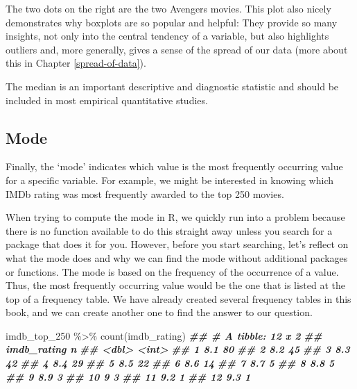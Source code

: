 \documentclass[
]{book}
\newenvironment{Shaded}{\begin{snugshade}}{\end{snugshade}}
\newcommand{\DocumentationTok}[1]{\textcolor[rgb]{0.56,0.35,0.01}{\textbf{\textit{#1}}}}
\newcommand{\FunctionTok}[1]{\textcolor[rgb]{0.00,0.00,0.00}{#1}}
\newcommand{\NormalTok}[1]{#1}
\newcommand{\SpecialCharTok}[1]{\textcolor[rgb]{0.00,0.00,0.00}{#1}}
\begin{document}
The two dots on the right are the two Avengers movies. This plot also nicely demonstrates why boxplots are so popular and helpful: They provide so many insights, not only into the central tendency of a variable, but also highlights outliers and, more generally, gives a sense of the spread of our data (more about this in Chapter \ref{spread-of-data}).

The median is an important descriptive and diagnostic statistic and should be included in most empirical quantitative studies.

\hypertarget{mode}{%
\subsection{Mode}\label{mode}}

Finally, the `mode' indicates which value is the most frequently occurring value for a specific variable. For example, we might be interested in knowing which IMDb rating was most frequently awarded to the top 250 movies.

When trying to compute the mode in R, we quickly run into a problem because there is no function available to do this straight away unless you search for a package that does it for you. However, before you start searching, let's reflect on what the mode does and why we can find the mode without additional packages or functions. The mode is based on the frequency of the occurrence of a value. Thus, the most frequently occurring value would be the one that is listed at the top of a frequency table. We have already created several frequency tables in this book, and we can create another one to find the answer to our question.

\begin{Shaded}
\begin{Highlighting}[]
\NormalTok{imdb\_top\_250 }\SpecialCharTok{\%\textgreater{}\%} \FunctionTok{count}\NormalTok{(imdb\_rating)}
\DocumentationTok{\#\# \# A tibble: 12 x 2}
\DocumentationTok{\#\#    imdb\_rating     n}
\DocumentationTok{\#\#          \textless{}dbl\textgreater{} \textless{}int\textgreater{}}
\DocumentationTok{\#\#  1         8.1    80}
\DocumentationTok{\#\#  2         8.2    45}
\DocumentationTok{\#\#  3         8.3    42}
\DocumentationTok{\#\#  4         8.4    29}
\DocumentationTok{\#\#  5         8.5    22}
\DocumentationTok{\#\#  6         8.6    14}
\DocumentationTok{\#\#  7         8.7     5}
\DocumentationTok{\#\#  8         8.8     5}
\DocumentationTok{\#\#  9         8.9     3}
\DocumentationTok{\#\# 10         9       3}
\DocumentationTok{\#\# 11         9.2     1}
\DocumentationTok{\#\# 12         9.3     1}
\end{Highlighting}
\end{Shaded}
\end{document}
